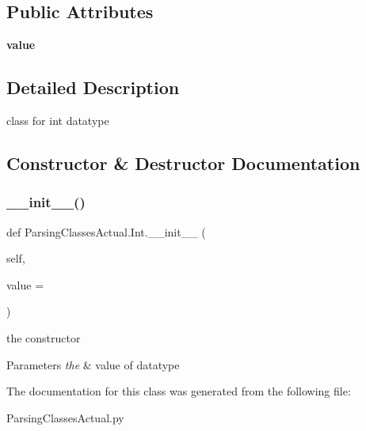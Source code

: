\subsection*{Public Attributes}
\begin{DoxyCompactItemize}
\item 
\mbox{\label{class_parsing_classes_actual_1_1_int_a87fd8a55e3d9dfc9799793ddb57fe340}} 
{\bfseries value}
\end{DoxyCompactItemize}


\subsection{Detailed Description}
class for int datatype 

\subsection{Constructor \& Destructor Documentation}
\mbox{\label{class_parsing_classes_actual_1_1_int_a138d3ed5b3b5bcc5f3aeeef5716a1c42}} 
\subsubsection{\texorpdfstring{\+\_\+\+\_\+init\+\_\+\+\_\+()}{\_\_init\_\_()}}
{\footnotesize\ttfamily def Parsing\+Classes\+Actual.\+Int.\+\_\+\+\_\+init\+\_\+\+\_\+ (\begin{DoxyParamCaption}\item[{}]{self,  }\item[{}]{value = {} }\end{DoxyParamCaption})}



the constructor 


\begin{DoxyParams}{Parameters}
{\em the} & value of datatype \\
\hline
\end{DoxyParams}


The documentation for this class was generated from the following file\+:\begin{DoxyCompactItemize}
\item 
Parsing\+Classes\+Actual.\+py\end{DoxyCompactItemize}
